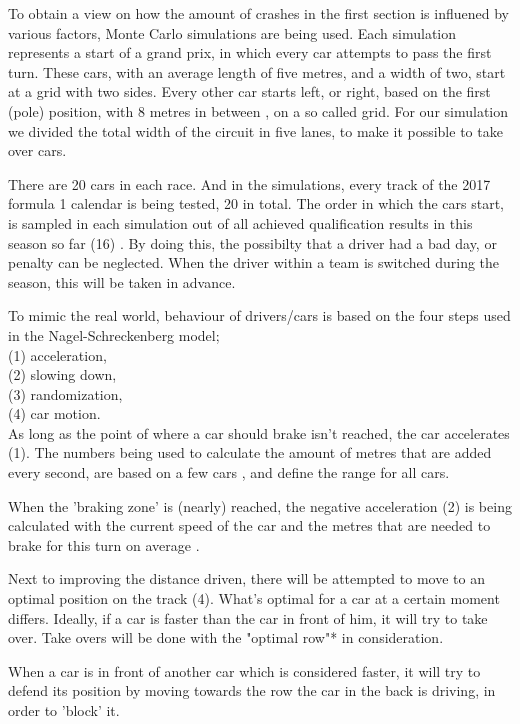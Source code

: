 To obtain a view on how the amount of crashes in the first section is influened by various factors, Monte Carlo simulations are being used. Each simulation represents a start of a grand prix, in which every car attempts to pass the first turn. These cars, with an average length of five metres, and a width of two, start at a grid with two sides. Every other car starts left, or right, based on the first (pole) position, with 8 metres in between \cite{car-regulations}, on a so called grid. For our simulation we divided the total width of the circuit in five lanes, to make it possible to take over cars.

There are 20 cars in each race. And in the simulations, every track of the 2017 formula 1 calendar is being tested, 20 in total. The order in which the cars start, is sampled in each simulation out of all achieved qualification results in this season so far (16) \cite{som}. By doing this, the possibilty that a driver had a bad day, or penalty can be neglected. When the driver within a team is switched during the season, this will be taken in advance.

To mimic the real world, behaviour of drivers/cars is based on the four steps used in the Nagel-Schreckenberg model;\\

\noindent
(1) acceleration,\\
(2) slowing down,\\
(3) randomization,\\
(4) car motion.\\

As long as the point of where a car should brake isn't reached, the car accelerates (1). The numbers being used to calculate the amount of metres that are added every second, are based on a few cars \cite{car-speeds}\cite{car-speeds-2}, and define the range for all cars.

When the 'braking zone' is (nearly) reached, the negative acceleration (2) is being calculated with the current speed of the car and the metres that are needed to brake for this turn on average \cite{som}.

Next to improving the distance driven, there will be attempted to move to an optimal position on the track (4). What's optimal for a car at a certain moment differs. Ideally, if a car is faster than the car in front of him, it will try to take over. Take overs will be done with the "optimal row"* in consideration.

When a car is in front of another car which is considered faster, it will try to defend its position by moving towards the row the car in the back is driving, in order to 'block' it.

